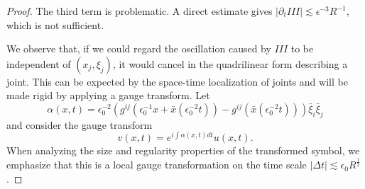 \documentclass{amsart}
\theoremstyle{definition}
\begin{document}
\begin{proof}
The third term is problematic. A direct estimate gives $|\partial_t III| \lesssim \epsilon^{-3} R^{-1}$, which is not sufficient.

\medskip

We observe that, if we could regard the oscillation caused by $III$ to be independent of $(x_j,\xi_j)$, it would cancel in the quadrilinear form describing a joint. This can be expected by the space-time localization of joints and will be made rigid by applying a gauge transform. Let
\begin{equation*}
\alpha(x,t) = \epsilon_0^{-2} ( g^{ij}(\epsilon_0^{-1} x + \bar{x}(\epsilon_0^{-2} t))-  g^{ij}(\bar{x}(\epsilon_0^{-2}t))) \bar{\xi}_i \bar{\xi}_j
\end{equation*}
and consider the gauge transform
\begin{equation*}
v(x,t) = e^{i \int \alpha(x,t) dt} u(x,t).
\end{equation*}
When analyzing the size and regularity properties of the transformed symbol, we emphasize that this is a local gauge transformation on the time scale $|\Delta t| \lesssim \epsilon_0 R^{\frac{1}{2}}$. 

\smallskip


\end{proof}
\end{document}
